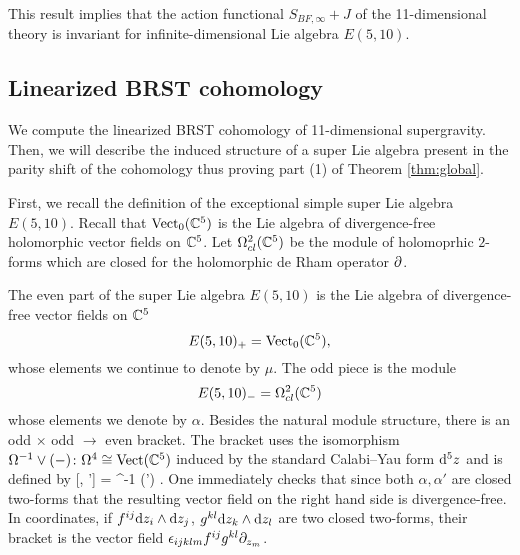 This result implies that the action functional $S_{BF, \infty} + J$ of the 11-dimensional theory is invariant for infinite-dimensional Lie algebra $E(5,10)$. 




\subsection{Linearized BRST cohomology} 

We compute the linearized BRST cohomology of 11-dimensional supergravity.
Then, we will describe the induced structure of a super Lie algebra present in the parity shift of the cohomology thus proving part (1) of Theorem \ref{thm:global}.

\parsec[]

First, we recall the definition of the exceptional simple super Lie algebra $E(5,10)$. 
Recall that ${\rm Vect}_0 (\mathbb C^5)$ is the Lie algebra of divergence-free holomorphic vector fields on $\mathbb C^5$.
Let $\Omega^{2}_{cl} (\mathbb C^5)$ be the module of holomoprhic $2$-forms which are closed for the holomorphic de Rham operator $\partial$.

The even part of the super Lie algebra $E(5,10)$ is the Lie algebra of divergence-free vector fields on $\mathbb C^5$
\[
E(5,10)_+ = {\rm Vect}_0(\mathbb C^5) ,
\]
whose elements we continue to denote by $\mu$. 
The odd piece is the module 
\[
E(5,10)_- = \Omega^{2}_{cl} (\mathbb C^5) 
\]
whose elements we denote by $\alpha$. 
Besides the natural module structure, there is an odd $\times$ odd $\to$ even bracket. 
The bracket uses the isomorphism $\Omega^{-1} \vee (-) \colon \Omega^{4} \cong {\rm Vect} (\mathbb C^5)$ induced by the standard Calabi--Yau form ${\rm d}^5 z$ and is defined by
\beqn\label{eqn:e510}
[\alpha, \alpha'] = \Omega^{-1} \vee (\alpha \wedge \alpha') .
\eeqn
One immediately checks that since both $\alpha, \alpha'$ are closed two-forms that the resulting vector field on the right hand side is divergence-free. 
In coordinates, if $f^{ij} {\rm d} z_i \wedge {\rm d} z_j$, $g^{kl} {\rm d} z_k \wedge {\rm d} z_l$ are two closed two-forms, their bracket is the vector field $\epsilon_{ijklm} f^{ij}g^{kl} \partial_{z_m}$. 

